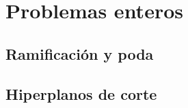 \chapter{Problemas enteros}
\label{ent}
\section{Ramificación y poda}
\section{Hiperplanos de corte}
